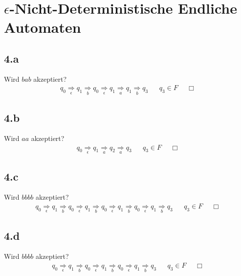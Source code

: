 \documentclass[10pt,ngerman]{scrartcl}
\begin{document}
\section{$\epsilon$-Nicht-Deterministische Endliche Automaten}
\subsection{4.a}
Wird $bab$ akzeptiert?
\begin{align*}
 q_0 \underset{\epsilon}{\Rightarrow} q_1 \underset{b}{\Rightarrow} q_0 \underset{\epsilon}{\Rightarrow} q_1 \underset{a}{\Rightarrow} q_1 \underset{b}{\Rightarrow} q_3 && q_3 \in F && \Box
\end{align*}
\subsection{4.b}
Wird $aa$ akzeptiert?
\begin{align*}
 q_0 \underset{\epsilon}{\Rightarrow} q_1 \underset{a}{\Rightarrow} q_2 \underset{a}{\Rightarrow} q_3 && q_3 \in F && \Box
\end{align*}
\subsection{4.c}
Wird $bbbb$ akzeptiert?
\begin{align*}
 q_0 \underset{\epsilon}{\Rightarrow} q_1 \underset{b}{\Rightarrow} q_0 \underset{\epsilon}{\Rightarrow} q_1 \underset{b}{\Rightarrow} q_0 \underset{\epsilon}{\Rightarrow} q_1 \underset{b}{\Rightarrow} q_0 \underset{\epsilon}{\Rightarrow} q_1 \underset{b}{\Rightarrow} q_3 && q_3 \in F && \Box
\end{align*}
\subsection{4.d}
Wird $bbbb$ akzeptiert?
\begin{align*}
 q_0 \underset{\epsilon}{\Rightarrow} q_1 \underset{b}{\Rightarrow} q_0 \underset{\epsilon}{\Rightarrow} q_1 \underset{b}{\Rightarrow} q_0 \underset{\epsilon}{\Rightarrow} q_1 \underset{b}{\Rightarrow} q_3 && q_3 \in F && \Box
\end{align*}
\end{document}
